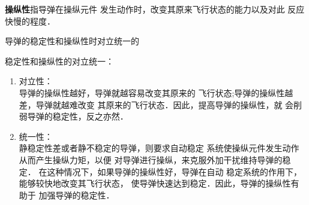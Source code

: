 {\bfseries 操纵性}指导弹在操纵元件
发生动作时，改变其原来飞行状态的能力以及对此
反应快慢的程度．
\begin{note}
导弹的稳定性和操纵性时对立统一的
\end{note}
\begin{notice}
稳定性和操纵性的对立统一：
\begin{enumerate}
  \item 对立性：\\ 
    导弹的操纵性越好，导弹就越容易改变其原来的
    飞行状态;导弹的操纵性越差，导弹就越难改变
    其原来的飞行状态．因此，提高导弹的操纵性，就
    会削弱导弹的稳定性，反之亦然．
  \item 统一性：\\ 
    静稳定性差或者静不稳定的导弹，则要求自动稳定
    系统使操纵元件发生动作从而产生操纵力矩，以便
    对导弹进行操纵，来克服外加干扰维持导弹的稳定．
    在这种情况下，如果导弹的操纵性好，导弹在自动
    稳定系统的作用下，能够较快地改变其飞行状态，
    使导弹快速达到稳定．因此，导弹的操纵性有助于
    加强导弹的稳定性．
\end{enumerate}
\end{notice}


